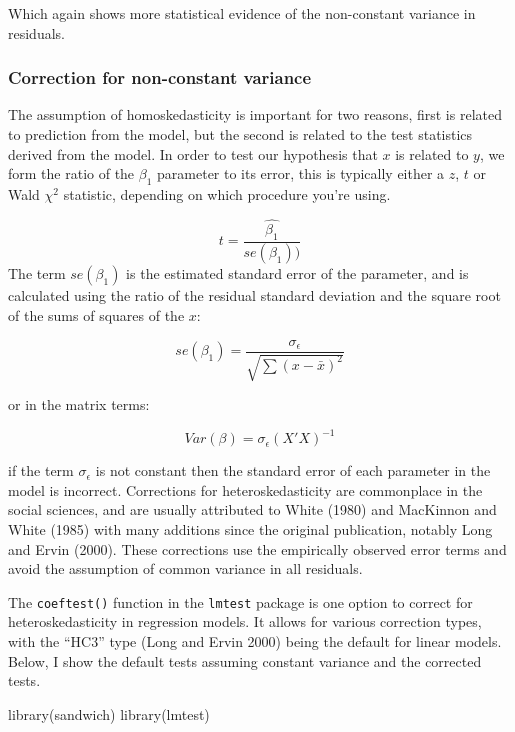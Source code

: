 \documentclass[
  letterpaper,
  DIV=11,
  numbers=noendperiod]{scrreprt}
\newenvironment{Shaded}{\begin{snugshade}}{\end{snugshade}}
\newcommand{\FunctionTok}[1]{\textcolor[rgb]{0.28,0.35,0.67}{#1}}
\newcommand{\NormalTok}[1]{\textcolor[rgb]{0.00,0.23,0.31}{#1}}
\begin{document}
Which again shows more statistical evidence of the non-constant variance
in residuals.

\hypertarget{correction-for-non-constant-variance}{%
\subsubsection{Correction for non-constant
variance}\label{correction-for-non-constant-variance}}

The assumption of homoskedasticity is important for two reasons, first
is related to prediction from the model, but the second is related to
the test statistics derived from the model. In order to test our
hypothesis that \(x\) is related to \(y\), we form the ratio of the
\(\beta_1\) parameter to its error, this is typically either a \(z\),
\(t\) or Wald \(\chi^2\) statistic, depending on which procedure you're
using.

\[t = \frac{\hat{\beta_1}}{se(\beta_1))}\] The term \(se(\beta_1)\) is
the estimated standard error of the parameter, and is calculated using
the ratio of the residual standard deviation and the square root of the
sums of squares of the \(x\):

\[se(\beta_1) = \frac{\sigma_{\epsilon}}{\sqrt{\sum(x - \bar{x})^2}}\]

or in the matrix terms:

\[Var(\beta) = \sigma_{\epsilon}(X'X)^{-1}\]

if the term \(\sigma_{\epsilon}\) is not constant then the standard
error of each parameter in the model is incorrect. Corrections for
heteroskedasticity are commonplace in the social sciences, and are
usually attributed to White (1980) and MacKinnon and White (1985) with
many additions since the original publication, notably Long and Ervin
(2000). These corrections use the empirically observed error terms and
avoid the assumption of common variance in all residuals.

The \texttt{coeftest()} function in the \texttt{lmtest} package is one
option to correct for heteroskedasticity in regression models. It allows
for various correction types, with the ``HC3'' type (Long and Ervin
2000) being the default for linear models. Below, I show the default
tests assuming constant variance and the corrected tests.

\begin{Shaded}
\begin{Highlighting}[]
\FunctionTok{library}\NormalTok{(sandwich)}
\FunctionTok{library}\NormalTok{(lmtest)}
\end{Highlighting}
\end{Shaded}
\end{document}
